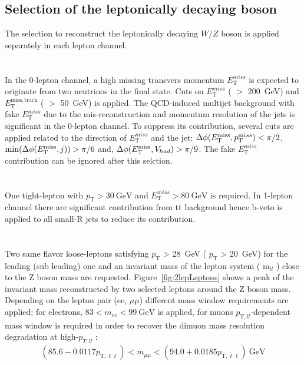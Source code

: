 \subsection{Selection of the leptonically decaying boson}
The selection to reconstruct the leptonically decaying $W/Z$ boson is applied separately in each lepton channel. \\ \\
\noindent\textbf{}  \\
In the 0-lepton channel, a high missing transvers momentum $E^{miss}_\mathrm{T}$ is expected to originate from two neutrinos in the final state. 
Cuts on $E^{miss}_\mathrm{T}$ ( $>$ 200~GeV) and $E^{\mathrm{miss,track}}_\mathrm{T}$ ( $>$ 50~GeV) is applied. 
The QCD-induced multijet background with fake $E^{miss}_\mathrm{T}$ due to the mis-reconstruction and momentum resolution of the jets is significant in the 0-lepton channel. 
To suppress its contribution, several cuts are applied related to the direction of $E^{miss}_\mathrm{T}$ and the jet: $\Delta\phi(E_\mathrm{T}^\mathrm{miss},p_{{\textrm T}}^{{\textrm miss}}) < \pi/2$, $\min(\Delta\phi(E_\mathrm{T}^\mathrm{miss},j)) > \pi/6$ and, $\Delta\phi(E_\mathrm{T}^\mathrm{miss}, V_{had}) > \pi/9$. The fake $E^{miss}_\mathrm{T}$ contribution can be ignored after this selction. \\ \\ 
\noindent\textbf{}  \\
One tight-lepton with $p_\mathrm{T} > 30~\mathrm{GeV}$ and $E^{miss}_\mathrm{T} > 80~\mathrm{GeV}$ is required. In 1-lepton channel there are significant contribution from t$\bar{\mathrm{t}}$ background hence b-veto is applied to all small-R jets to reduce its contribution.\\ \\
\noindent\textbf{}  \\
Two same flavor loose-leptons satisfying $p_\mathrm{T}$ > 28~GeV ( $p_\mathrm{T}$ > 20~GeV) for the leading (sub leading) one 
and an invariant mass of the lepton system ( m$_{ll}$ ) close to the Z boson mass are requested. Figure~\ref{fig:2lepLeptons} shows a peak of the invariant mass reconstructed by two selected leptons around the Z boson mass. Depending on the lepton pair (ee, $\mu\mu$) different mass
window requirements are applied; for electrons, $83<m_{ee}<99 ~\mathrm{GeV}$ is applied, for muons $p_{\mathrm{T},ll}$-dependent mass window is required in order to recover the dimuon mass resolution degradation at high-$p_{T,ll}$ \cite{EXOT-2016-29}:
\begin{equation*}
\left(85.6-0.0117 p_{\mathrm{T}, \ell \ell}\right)<m_{\mu \mu}<\left(94.0+0.0185 p_{\mathrm{T}, \ell \ell}\right) ~\mathrm{GeV}
\end{equation*}

